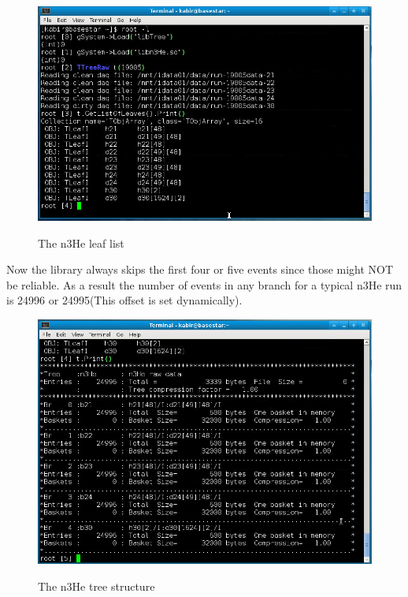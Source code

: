 \documentclass[12pt]{article}
\begin{document}
\begin{figure}[htb]
\centering
\includegraphics[width=6in]{treeStructure1.png}\\
\caption{The n3He leaf list}\label{f3}
\end{figure}

Now the library always skips the first four or five events since those might NOT be reliable. As a result the number of events in any branch for a typical n3He run is 24996 or 24995(This offset is set dynamically).

\begin{figure}[htb]
\centering
\includegraphics[width=6in]{treeStructure2.png}\\
\caption{The n3He tree structure}\label{f4}
\end{figure}
\end{document}
